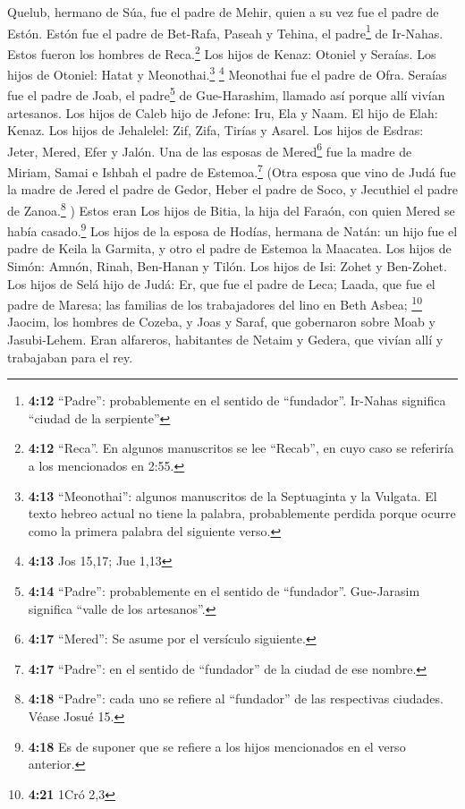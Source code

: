  Quelub, hermano de Súa, fue el padre de Mehir, quien a
su vez fue el padre de Estón.  Estón fue el padre de
Bet-Rafa, Paseah y Tehina, el padre\footnote{\textbf{4:12} ``Padre'':
  probablemente en el sentido de ``fundador''. Ir-Nahas significa
  ``ciudad de la serpiente''} de Ir-Nahas. Estos fueron los hombres de
Reca.\footnote{\textbf{4:12} ``Reca''. En algunos manuscritos se lee
  ``Recab'', en cuyo caso se referiría a los mencionados en 2:55.}
 Los hijos de Kenaz: Otoniel y Seraías. Los hijos de
Otoniel: Hatat y Meonothai.\footnote{\textbf{4:13} ``Meonothai'':
  algunos manuscritos de la Septuaginta y la Vulgata. El texto hebreo
  actual no tiene la palabra, probablemente perdida porque ocurre como
  la primera palabra del siguiente verso.} \footnote{\textbf{4:13} Jos
  15,17; Jue 1,13}  Meonothai fue el padre de Ofra.
Seraías fue el padre de Joab, el padre\footnote{\textbf{4:14} ``Padre'':
  probablemente en el sentido de ``fundador''. Gue-Jarasim significa
  ``valle de los artesanos''.} de Gue-Harashim, llamado así porque allí
vivían artesanos.  Los hijos de Caleb hijo de Jefone:
Iru, Ela y Naam. El hijo de Elah: Kenaz.  Los hijos de
Jehalelel: Zif, Zifa, Tirías y Asarel.  Los hijos de
Esdras: Jeter, Mered, Efer y Jalón. Una de las esposas de
Mered\footnote{\textbf{4:17} ``Mered'': Se asume por el versículo
  siguiente.} fue la madre de Miriam, Samai e Ishbah el padre de
Estemoa.\footnote{\textbf{4:17} ``Padre'': en el sentido de ``fundador''
  de la ciudad de ese nombre.}  (Otra esposa que vino de
Judá fue la madre de Jered el padre de Gedor, Heber el padre de Soco, y
Jecuthiel el padre de Zanoa.\footnote{\textbf{4:18} ``Padre'': cada uno
  se refiere al ``fundador'' de las respectivas ciudades. Véase Josué
  15.} ) Estos eran Los hijos de Bitia, la hija del Faraón, con quien
Mered se había casado.\footnote{\textbf{4:18} Es de suponer que se
  refiere a los hijos mencionados en el verso anterior.} 
Los hijos de la esposa de Hodías, hermana de Natán: un hijo fue el padre
de Keila la Garmita, y otro el padre de Estemoa la Maacatea.
 Los hijos de Simón: Amnón, Rinah, Ben-Hanan y Tilón. Los
hijos de Isi: Zohet y Ben-Zohet.  Los hijos de Selá hijo
de Judá: Er, que fue el padre de Leca; Laada, que fue el padre de
Maresa; las familias de los trabajadores del lino en Beth Asbea;
\footnote{\textbf{4:21} 1Cró 2,3}  Jaocim, los hombres de
Cozeba, y Joas y Saraf, que gobernaron sobre Moab y Jasubi-Lehem.
 Eran alfareros, habitantes de Netaim y Gedera, que
vivían allí y trabajaban para el rey.

